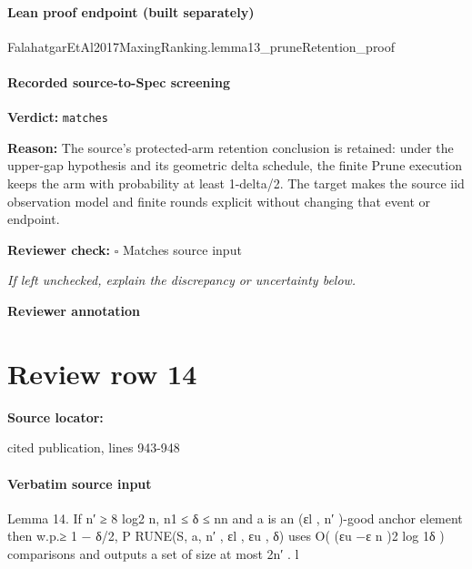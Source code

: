 \documentclass[10pt]{article}
\newcommand{\reviewerbox}{%
  \par\noindent\fbox{\parbox{0.96\linewidth}{\rule{0pt}{0.38in}}}\par
}
\newcommand{\reviewmatch}[1]{%
  \par\noindent\textbf{Reviewer check:} $\square$\; #1\par
  \noindent\emph{If left unchecked, explain the discrepancy or uncertainty below.}\par
}
\begin{document}
\paragraph{Lean proof endpoint (built separately)}\begin{ReviewVerbatim}
FalahatgarEtAl2017MaxingRanking.lemma13_pruneRetention_proof
\end{ReviewVerbatim}

\paragraph{Recorded source-to-Spec screening}
\textbf{Verdict:} \texttt{matches}
\\
{\raggedright
\textbf{Reason:} The source's protected-\allowbreak{}arm retention conclusion is retained:\allowbreak{} under the upper-\allowbreak{}gap hypothesis and its geometric delta schedule, the finite Prune execution keeps the arm with probability at least 1-\allowbreak{}delta/\allowbreak{}2.\allowbreak{} The target makes the source iid observation model and finite rounds explicit without changing that event or endpoint.\allowbreak{}
\par}
\reviewmatch{Matches source input}
\noindent\textbf{Reviewer annotation}\par
\reviewerbox
\clearpage
\hypertarget{source-claim-0539092a1e145803}{}
\section*{Review row 14}
\textbf{Source locator:} {\footnotesize\raggedright cited publication, lines 943-\allowbreak{}948\par}
\paragraph{Verbatim source input}
\begin{ReviewVerbatim}
Lemma 14. If n′ ≥ 8 log2 n, n1 ≤ δ ≤ nn and a is an (εl , n′ )-good anchor element then w.p.≥ 1 − δ/2,
P RUNE(S, a, n′ , εl , εu , δ) uses O( (εu −ε
                                           n
                                              )2
                                                 log 1δ ) comparisons and outputs a set of size at most 2n′ .
                                           l
\end{ReviewVerbatim}
\end{document}
